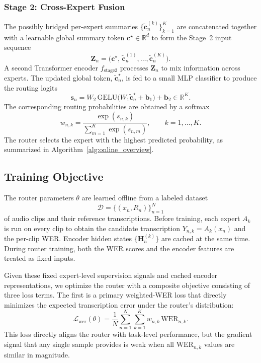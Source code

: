 \documentclass[journal]{IEEEtran}
\begin{document}
\subsubsection{Stage 2: Cross-Expert Fusion}

The possibly bridged per-expert summaries
$\bigl\{\widetilde{\mathbf{c}}_n^{(k)}\bigr\}_{k=1}^{K}$ are
concatenated together with a learnable global summary token
$\mathbf{c}^{\star}\in\mathbb{R}^{d}$ to form the Stage~2 input
sequence
\[
\mathbf{Z}_n =
\bigl(\mathbf{c}^{\star},\,
\widetilde{\mathbf{c}}_n^{(1)},\dots,\widetilde{\mathbf{c}}_n^{(K)}\bigr).
\]
A second Transformer encoder $f_{\text{stage2}}$ processes
$\mathbf{Z}_n$ to mix information across experts. The updated global
token, $\widetilde{\mathbf{c}}^{\star}_n$, is fed to a small MLP
classifier to produce the routing logits
\begin{equation}
\mathbf{s}_n =
W_2\,\mathrm{GELU}\bigl(W_1\widetilde{\mathbf{c}}^{\star}_n
+\mathbf{b}_1\bigr) + \mathbf{b}_2 \in \mathbb{R}^{K}.
\label{eq:logits}
\end{equation}
The corresponding routing probabilities are obtained by a softmax
\begin{equation}
w_{n,k} =
\frac{\exp(s_{n,k})}{\sum_{m=1}^{K}\exp(s_{n,m})},
\qquad k=1,\dots,K.
\label{eq:router_softmax}
\end{equation}
The router selects the expert with the highest predicted probability, as summarized in Algorithm~\ref{alg:online_overview}.

\subsection{Training Objective}
\label{subsec:training_objective}

The router parameters $\theta$ are learned offline from a labeled
dataset
\[
\mathcal{D}=\{(x_n,R_n)\}_{n=1}^{N}
\]
of audio clips and their reference transcriptions. Before training,
each expert $A_k$ is run on every clip to obtain the candidate
transcription $Y_{n,k}=A_k(x_n)$ and the per-clip WER. Encoder hidden states $\{\mathbf{H}_n^{(k)}\}$ are cached at the same time. During router training, both the WER scores and the encoder features are treated as fixed inputs.

Given these fixed expert-level supervision signals and cached encoder representations, we optimize the router with a composite objective consisting of three loss terms. The first is a primary weighted-WER loss that directly minimizes the expected
transcription error under the router's distribution:
\begin{equation}
\mathcal{L}_{\text{wer}}(\theta) =
\frac{1}{N}\sum_{n=1}^{N}\sum_{k=1}^{K}
w_{n,k}\,\mathrm{WER}_{n,k}.
\label{eq:loss_wer}
\end{equation}
This loss directly aligns the router with task-level performance, but
the gradient signal that any single sample provides is weak when all
$\mathrm{WER}_{n,k}$ values are similar in magnitude.
\end{document}

